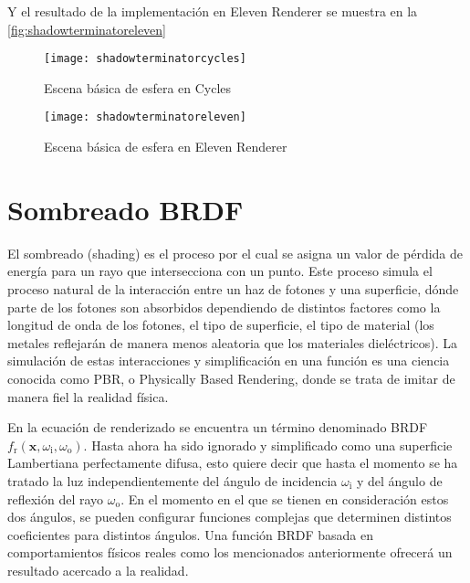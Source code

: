 Y el resultado de la implementación en Eleven Renderer se muestra en la \autoref{fig:shadowterminatoreleven}

\begin{figure}[H]
		\centering
	  \begin{minipage}[b]{0.4\textwidth}
		\texttt{[image: shadowterminatorcycles]}
		\caption{Escena básica de esfera en Cycles}
		\label{fig:shadowterminatorcycles}
	  \end{minipage}
	  \hfill
	  \begin{minipage}[b]{0.4\textwidth}
		\texttt{[image: shadowterminatoreleven]}
		\caption{Escena básica de esfera en Eleven Renderer}
		\label{fig:shadowterminatoreleven}
	  \end{minipage}
	  	\hfill
\end{figure}
	
\section{Sombreado BRDF}
	
El sombreado (shading) es el proceso por el cual se asigna un valor de pérdida de energía para un rayo que intersecciona con un punto. Este proceso simula el proceso natural de la interacción entre un haz de fotones y una superficie, dónde parte de los fotones son absorbidos dependiendo de distintos factores como la longitud de onda de los fotones, el tipo de superficie, el tipo de material (los metales reflejarán de manera menos aleatoria que los materiales dieléctricos). La simulación de estas interacciones y simplificación en una función es una ciencia conocida como PBR, o Physically Based Rendering, donde se trata de imitar de manera fiel la realidad física. 
		
En la ecuación de renderizado se encuentra un término denominado BRDF $f_{\text{r}}(\mathbf {x} ,\omega _{\text{i}},\omega _{\text{o}})$. Hasta ahora ha sido ignorado y simplificado como una superficie Lambertiana perfectamente difusa, esto quiere decir que hasta el momento se ha tratado la luz independientemente del ángulo de incidencia $\omega _{\text{i}}$ y del ángulo de reflexión del rayo $\omega _{\text{o}}$. En el momento en el que se tienen en consideración estos dos ángulos, se pueden configurar funciones complejas que determinen distintos coeficientes para distintos ángulos. Una función BRDF basada en comportamientos físicos reales como los mencionados anteriormente ofrecerá un resultado acercado a la realidad. 
	
